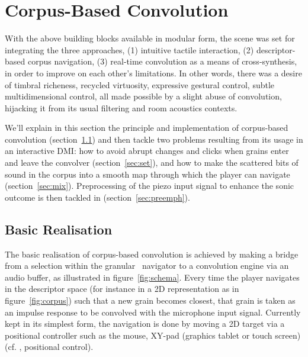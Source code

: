 \section{Corpus-Based Convolution} %

With the above building blocks available in modular form, the scene was set for integrating the three approaches, (1) intuitive tactile interaction, (2) descriptor-based corpus navigation, (3) real-time convolution as a means of cross-synthesis, in order to improve on each other's limitations. In other words, there was a desire of timbral richeness, recycled virtuosity, expressive gestural control, subtle multidimensional control, all made possible by a slight abuse of convolution, hijacking it from its usual filtering and room acoustics contexts.

We'll explain in this section the principle and implementation of corpus-based convolution (section~\ref{sec:basic}) and then tackle two problems resulting from its usage in an interactive DMI: 
how to avoid abrupt changes and clicks when grains enter and leave the convolver (section~\ref{sec:set}), and
how to make the scattered bits of sound in the corpus into a smooth map through which the player can navigate (section~\ref{sec:mix}). Preprocessing of the piezo input signal to enhance the sonic outcome is then tackled in (section~\ref{sec:preemph}).

\subsection{Basic Realisation}\label{sec:basic}


The basic realisation of corpus-based convolution is achieved by making a bridge from a selection within the granular \cbcs\ navigator to a convolution engine via an audio buffer, as illustrated in figure~\ref{fig:schema}.  Every time the player navigates in the descriptor space (for instance in a 2D representation as in figure~\ref{fig:corpus}) such that a new grain becomes closest, that grain is taken as an impulse response to be convolved with the microphone input signal. Currently kept in its simplest form, the navigation is done by moving a 2D target via a positional controller such as the mouse, XY-pad (graphics tablet or touch screen) (cf. \cite{Schwarz-nime2012-sound-space}, positional control).


